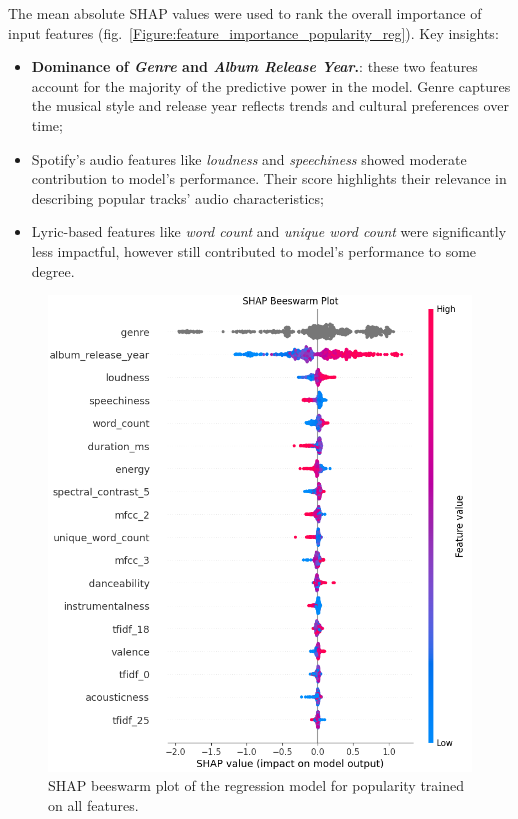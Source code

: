 The mean absolute SHAP values were used to rank the overall importance of input
features (fig.~\ref{Figure:feature_importance_popularity_reg}). Key insights:
\begin{itemize}
  \item \textbf{Dominance of \textit{Genre} and \textit{Album Release Year}.}:
    these two features account for the majority of the predictive power in the
    model. Genre captures the musical style and release year reflects trends
    and cultural preferences over time;
  \item Spotify's audio features like \textit{loudness} and
    \textit{speechiness} showed moderate contribution to model's performance.
    Their score highlights their relevance in describing popular tracks' audio
    characteristics;
  \item Lyric-based features like \textit{word count} and \textit{unique word
    count} were significantly less impactful, however still contributed to
    model's performance to some degree.
\end{itemize}

\begin{center}
\begin{figure}[H]
  \centering
  \includegraphics[width=6in]{img/beeswarm_popularity_reg.png}
  \caption{SHAP beeswarm plot of the regression model for popularity trained on all features.}
  \label{Figure:beeswarm_popularity_reg}
\end{figure}
\end{center}

